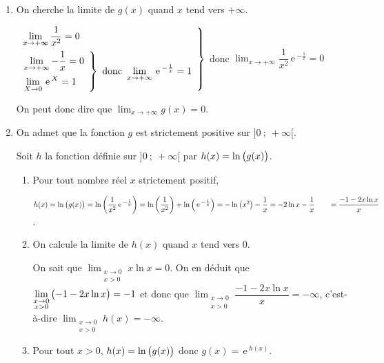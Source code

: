 \documentclass[10pt,a4paper]{article}
\newcommand{\e}{\mathrm{\,e\,}}%
\newcommand{\ds}{\displaystyle}
\begin{document}
\begin{enumerate}
\item On cherche la limite de $g(x)$ quand $x$ tend vers $+\infty$.

$\left .
\begin{array}{l}
\ds\lim_{x\to +\infty} \dfrac{1}{x^2}=0\\[9pt]
\left .
\begin{array}{@{}l}
\ds\lim_{x\to +\infty} -\dfrac{1}{x} = 0\\[9pt]
\ds\lim_{X\to 0} \e^{X} = 1\\
\end{array}
\right \rbrace
\text{ donc }
\ds\lim_{x\to +\infty} \e^{-\frac{1}{x}}=1
\end{array}
\right \rbrace$
donc
$\ds\lim_{x\to +\infty} \dfrac{1}{x^2} \e^{-\frac{1}{x}}=0$

\smallskip

On peut donc dire que $\ds\lim_{x\to +\infty} g(x)=0$.

\item On admet que la fonction $g$ est strictement positive sur $]0~;~+\infty[$.

Soit $h$ la fonction définie sur $]0~;~+\infty[$ par $h(x)=\ln\left ( g(x) \strut\right )$.

\begin{enumerate}
\item Pour tout nombre réel $x$ strictement positif, 

$h(x)=  \ln\left ( g(x) \strut\right ) 
= \ln\left (  \dfrac{1}{x^2} \e^{-\frac{1}{x}}\right )
= \ln\left (\dfrac{1}{x^2}\right ) +  \ln\left ( \e^{-\frac{1}{x}} \right )
= -\ln\left (x^2\strut \right ) -\dfrac{1}{x}
= -2 \ln x  - \dfrac{1}{x}\\[7pt]
\phantom{h(x)}
= \dfrac{-1-2x\ln x}{x}$.

\item On calcule la limite de $h(x)$ quand $x$ tend vers 0.

On sait que $\ds\lim_{\substack{x\to 0\\x>0}} x \ln x = 0$.
On en déduit que \\
$\ds\lim_{\substack{x\to 0\\x>0}} \left (-1-2x \ln x\strut\right ) = -1$ et donc que
$\ds\lim_{\substack{x\to 0\\x>0}} \dfrac{-1-2x\ln x}{x} = -\infty$, c'est-à-dire
$\ds\lim_{\substack{x\to 0\\x>0}} h(x)= -\infty$. 

\item%
Pour tout $x>0$, $h(x)=\ln\left (g(x)\strut\right )$ donc $g(x) = \e^{h(x)}$.


\end{enumerate}
\end{enumerate}
\end{document}
